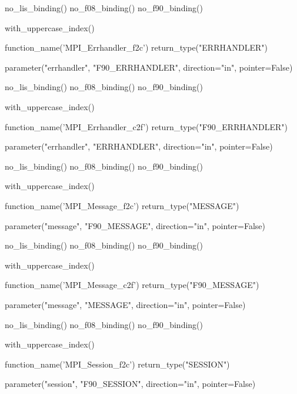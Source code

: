 %
\begin{mpi-binding}
    no_lis_binding()
    no_f08_binding()
    no_f90_binding()

    with_uppercase_index()

    function_name('MPI_Errhandler_f2c')
    return_type("ERRHANDLER")

    parameter("errhandler", "F90_ERRHANDLER", direction="in", pointer=False)
\end{mpi-binding}

%
\begin{mpi-binding}
    no_lis_binding()
    no_f08_binding()
    no_f90_binding()

    with_uppercase_index()

    function_name('MPI_Errhandler_c2f')
    return_type("F90_ERRHANDLER")

    parameter("errhandler", "ERRHANDLER", direction="in", pointer=False)
\end{mpi-binding}

%
\begin{mpi-binding}
    no_lis_binding()
    no_f08_binding()
    no_f90_binding()

    with_uppercase_index()

    function_name('MPI_Message_f2c')
    return_type("MESSAGE")

    parameter("message", "F90_MESSAGE", direction="in", pointer=False)
\end{mpi-binding}

%
\begin{mpi-binding}
    no_lis_binding()
    no_f08_binding()
    no_f90_binding()

    with_uppercase_index()

    function_name('MPI_Message_c2f')
    return_type("F90_MESSAGE")

    parameter("message", "MESSAGE", direction="in", pointer=False)
\end{mpi-binding}

%
\begin{mpi-binding}
    no_lis_binding()
    no_f08_binding()
    no_f90_binding()

    with_uppercase_index()

    function_name('MPI_Session_f2c')
    return_type("SESSION")

    parameter("session", "F90_SESSION", direction="in", pointer=False)
\end{mpi-binding}


